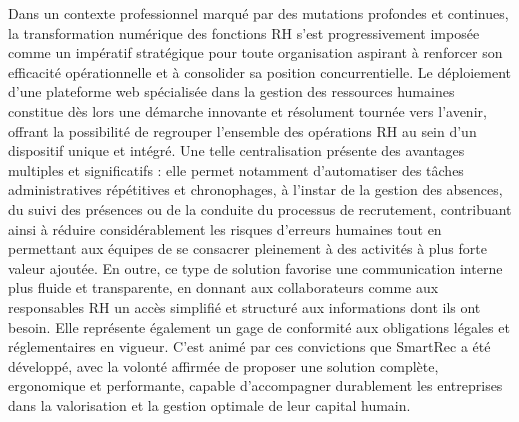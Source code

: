 Dans un contexte professionnel marqué par des mutations profondes et continues, la transformation numérique des fonctions RH s'est progressivement imposée comme un impératif stratégique pour toute organisation aspirant à renforcer son efficacité opérationnelle et à consolider sa position concurrentielle. Le déploiement d'une plateforme web spécialisée dans la gestion des ressources humaines constitue dès lors une démarche innovante et résolument tournée vers l'avenir, offrant la possibilité de regrouper l'ensemble des opérations RH au sein d'un dispositif unique et intégré. Une telle centralisation présente des avantages multiples et significatifs : elle permet notamment d'automatiser des tâches administratives répétitives et chronophages, à l'instar de la gestion des absences, du suivi des présences ou de la conduite du processus de recrutement, contribuant ainsi à réduire considérablement les risques d'erreurs humaines tout en permettant aux équipes de se consacrer pleinement à des activités à plus forte valeur ajoutée. En outre, ce type de solution favorise une communication interne plus fluide et transparente, en donnant aux collaborateurs comme aux responsables RH un accès simplifié et structuré aux informations dont ils ont besoin. Elle représente également un gage de conformité aux obligations légales et réglementaires en vigueur. C'est animé par ces convictions que SmartRec a été développé, avec la volonté affirmée de proposer une solution complète, ergonomique et performante, capable d'accompagner durablement les entreprises dans la valorisation et la gestion optimale de leur capital humain.



